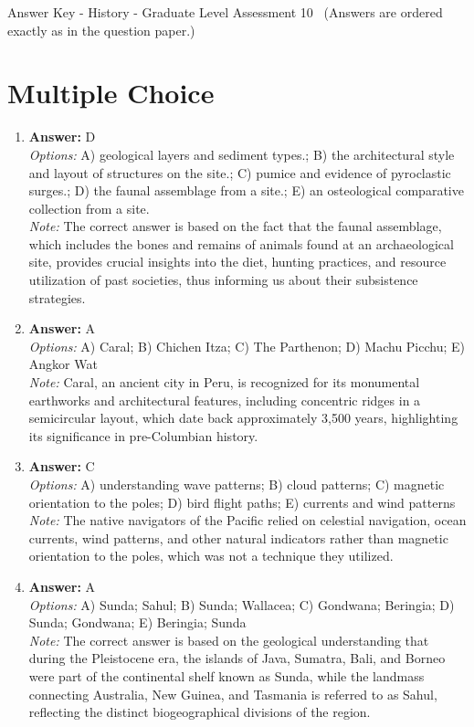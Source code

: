 \documentclass[12pt]{article}
\begin{document}
\begin{center}
Answer Key - History - Graduate Level Assessment 10 \
\small (Answers are ordered exactly as in the question paper.)
\end{center}

\section*{Multiple Choice}
\begin{enumerate}[label=\arabic*.]
\item \textbf{Answer:} D
\\ \textit{Options:} A) geological layers and sediment types.; B) the architectural style and layout of structures on the site.; C) pumice and evidence of pyroclastic surges.; D) the faunal assemblage from a site.; E) an osteological comparative collection from a site.
\\ \textit{Note:} The correct answer is based on the fact that the faunal assemblage, which includes the bones and remains of animals found at an archaeological site, provides crucial insights into the diet, hunting practices, and resource utilization of past societies, thus informing us about their subsistence strategies.
\item \textbf{Answer:} A
\\ \textit{Options:} A) Caral; B) Chichen Itza; C) The Parthenon; D) Machu Picchu; E) Angkor Wat
\\ \textit{Note:} Caral, an ancient city in Peru, is recognized for its monumental earthworks and architectural features, including concentric ridges in a semicircular layout, which date back approximately 3,500 years, highlighting its significance in pre-Columbian history.
\item \textbf{Answer:} C
\\ \textit{Options:} A) understanding wave patterns; B) cloud patterns; C) magnetic orientation to the poles; D) bird flight paths; E) currents and wind patterns
\\ \textit{Note:} The native navigators of the Pacific relied on celestial navigation, ocean currents, wind patterns, and other natural indicators rather than magnetic orientation to the poles, which was not a technique they utilized.
\item \textbf{Answer:} A
\\ \textit{Options:} A) Sunda; Sahul; B) Sunda; Wallacea; C) Gondwana; Beringia; D) Sunda; Gondwana; E) Beringia; Sunda
\\ \textit{Note:} The correct answer is based on the geological understanding that during the Pleistocene era, the islands of Java, Sumatra, Bali, and Borneo were part of the continental shelf known as Sunda, while the landmass connecting Australia, New Guinea, and Tasmania is referred to as Sahul, reflecting the distinct biogeographical divisions of the region.

\end{enumerate}
\end{document}
